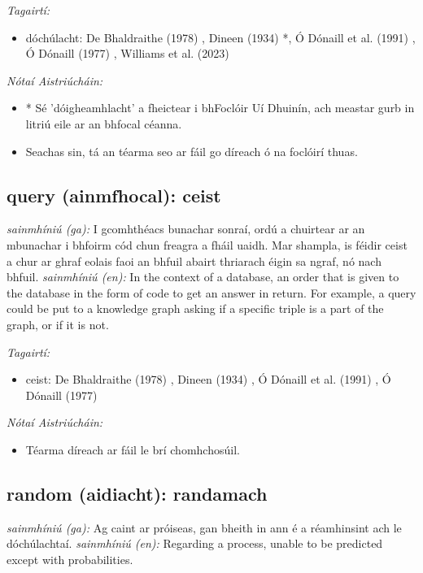 \documentclass{article}
\begin{document}
 \noindent \textit{Tagairtí:}
\begin{itemize}
	\item dóchúlacht: De Bhaldraithe (1978) \cite{de-bhaldraithe}, Dineen (1934) \cite{dineen}*, Ó Dónaill et al. (1991) \cite{focloir-beag}, Ó Dónaill (1977) \cite{odonaill}, Williams et al. (2023) \cite{storchiste}
\end{itemize}

 \noindent \textit{Nótaí Aistriúcháin:}
\begin{itemize}
	\item * Sé 'dóigheamhlacht' a fheictear i bhFoclóir Uí Dhuinín, ach meastar gurb in litriú eile ar an bhfocal céanna.
	\item Seachas sin, tá an téarma seo ar fáil go díreach ó na foclóirí thuas.
\end{itemize}


\subsection*{query (ainmfhocal): ceist} 
 \noindent \textit{sainmhíniú (ga):} I gcomhthéacs bunachar sonraí, ordú a chuirtear ar an mbunachar i bhfoirm cód chun freagra a fháil uaidh. Mar shampla, is féidir ceist a chur ar ghraf eolais faoi an bhfuil abairt thriarach éigin sa ngraf, nó nach bhfuil.
\newline\newline
 \noindent \textit{sainmhíniú (en):} In the context of a database, an order that is given to the database in the form of code to get an answer in return. For example, a query could be put to a knowledge graph asking if a specific triple is a part of the graph, or if it is not.
\newline

 \noindent \textit{Tagairtí:}
\begin{itemize}
	\item ceist: De Bhaldraithe (1978) \cite{de-bhaldraithe}, Dineen (1934) \cite{dineen}, Ó Dónaill et al. (1991) \cite{focloir-beag}, Ó Dónaill (1977) \cite{odonaill}
\end{itemize}

 \noindent \textit{Nótaí Aistriúcháin:}
\begin{itemize}
	\item Téarma díreach ar fáil le brí chomhchosúil.
\end{itemize}


\subsection*{random (aidiacht): randamach} 
 \noindent \textit{sainmhíniú (ga):} Ag caint ar próiseas, gan bheith in ann é a réamhinsint ach le dóchúlachtaí.
\newline\newline
 \noindent \textit{sainmhíniú (en):} Regarding a process, unable to be predicted except with probabilities.
\newline
\end{document}
